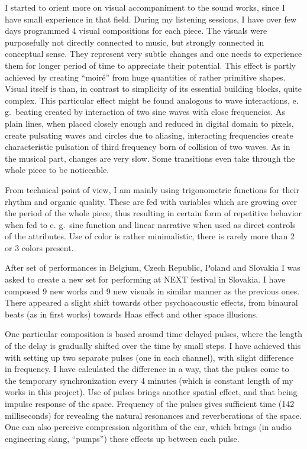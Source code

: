 \documentclass[11pt,a4paper,oneside]{report}
\begin{document}
I started to orient more on visual accompaniment to the sound works, since I have small experience in that field. During my listening sessions, I have over few days programmed 4 visual compositions for each piece. The visuals were purposefully not directly connected to music, but strongly connected in conceptual sense. They represent very subtle changes and one needs to experience them for longer period of time to appreciate their potential. This effect is partly achieved by creating ``moiré'' from huge quantities of rather primitive shapes. Visual itself is than, in contrast to simplicity of its essential building blocks, quite complex. This particular effect might be found analogous to wave interactions, e. g.\ beating created by interaction of two sine waves with close frequencies. As plain lines, when placed closely enough and reduced in digital domain to pixels, create pulsating waves and circles due to aliasing, interacting frequencies create characteristic pulsation of third frequency born of collision of two waves. As in the musical part, changes are very slow. Some transitions even take through the whole piece to be noticeable.

From technical point of view, I am mainly using trigonometric functions for their rhythm and organic quality. These are fed with variables which are growing over the period of the whole piece, thus resulting in certain form of repetitive behavior when fed to e. g.\ sine function and linear narrative when used as direct controls of the attributes. Use of color is rather minimalistic, there is rarely more than 2 or 3 colors present.

After set of performances in Belgium, Czech Republic, Poland and Slovakia I was asked to create a new set for performing at NEXT festival in Slovakia. I have composed 9 new works and 9 new visuals in similar manner as the previous ones. There appeared a slight shift towards other psychoacoustic effects, from binaural beats (as in first works) towards Haas effect and other space illusions.

One particular composition is based around time delayed pulses, where the length of the delay is gradually shifted over the time by small steps. I have achieved this with setting up two separate pulses (one in each channel), with slight difference in frequency. I have calculated the difference in a way, that the pulses come to the temporary synchronization every 4 minutes (which is constant length of my works in this project). Use of pulses brings another spatial effect, and that being impulse response of the space. Frequency of the pulses gives sufficient time (142 milliseconds) for revealing the natural resonances and reverberations of the space. One can also perceive compression algorithm of the ear, which brings (in audio engineering slang, ``pumps'') these effects up between each pulse.
\end{document}
